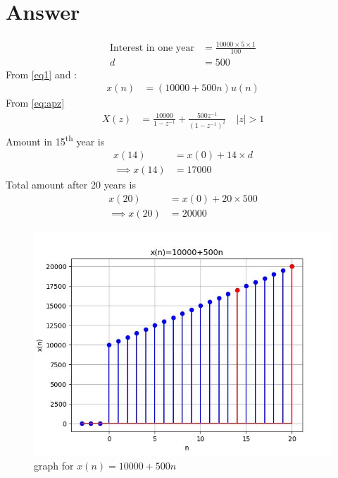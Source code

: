 \documentclass[journal,12pt,twocolumn]{IEEEtran}
\theoremstyle{remark}
\begin{document}
\section*{Answer}
\fi

\begin{align}
\text{Interest in one year} &= \frac{10000\times5\times1}{100}\\    
    d &= 500\label{eq1}
\end{align}
From \eqref{eq1} and :
    \begin{align}
        x(n) &= (10000 + 500n)u(n)
    \end{align}
From \eqref{eq:apz}
    \begin{align}
        X(z) &= \frac{10000}{1-z^{-1}} + \frac{500z^{-1}}{(1-z^{-1})^2} \quad |z|>1
    \end{align}
Amount in 15\textsuperscript{th} year is
    \begin{align}
        x(14) &= x(0) + 14\times d\\
        \implies x(14) &= 17000
    \end{align}
Total amount after 20 years is
    \begin{align}
        x(20) &= x(0) + 20\times 500\\
        \implies x(20) &= 20000
    \end{align}
    \begin{figure}[h]
    \renewcommand\thefigure{1}
        \centering
        \includegraphics[width=1\linewidth]{ncert-maths/11/9/5/30/figs/p.jpeg}
        \caption{graph for $x(n) = 10000 + 500n$}
        \label{graph}
    \end{figure}

\end{document}
